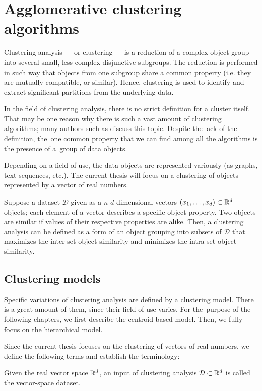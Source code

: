 \chapter{Agglomerative clustering algorithms}

Clustering analysis --- or clustering --- is a reduction of a complex object group into several small, less complex disjunctive subgroups. The reduction is performed in such way that objects from one subgroup share a common property (i.e. they are mutually compatible, or similar). Hence, clustering is used to identify and extract significant partitions from the underlying data. 

In the field of clustering analysis, there is no strict definition for a cluster itself. That may be one reason why there is such a vast amount of clustering algorithms; many authors such as \citet{estivill2002so} discuss this topic.  Despite the lack of the definition, the~one common property that we can find among all the algorithms is the presence of a~group of data objects.

Depending on a field of use, the data objects are represented variously (as graphs, text sequences, etc.). The current thesis will focus on a clustering of objects represented by a vector of real numbers.

Suppose a dataset $\mathcal{D}$ given as a $n$ $d$-dimensional vectors $(x_1,\dots,x_d) \subset \mathbb{R}^d$  --- objects; each element of a vector describes a specific object property. Two objects are similar if values of their respective properties are alike. Then, a clustering analysis can be defined as a form of an object grouping into subsets of $\mathcal{D}$ that maximizes the inter-set object similarity and minimizes the intra-set object similarity.

\section{Clustering models}

Specific variations of clustering analysis are defined by a clustering model. There is a great amount of them, since their field of use varies. For the~purpose of the following chapters, we first describe the centroid-based model. Then, we fully focus on the hierarchical model. 

Since the current thesis focuses on the clustering of vectors of real numbers, we define the following terms and establish the terminology:

\begin{defn}
	Given the real vector space $\mathbb{R}^d$, an input of clustering analysis $\mathcal{D}\subset\mathbb{R}^d$ is called the vector-space dataset.
\end{defn}

